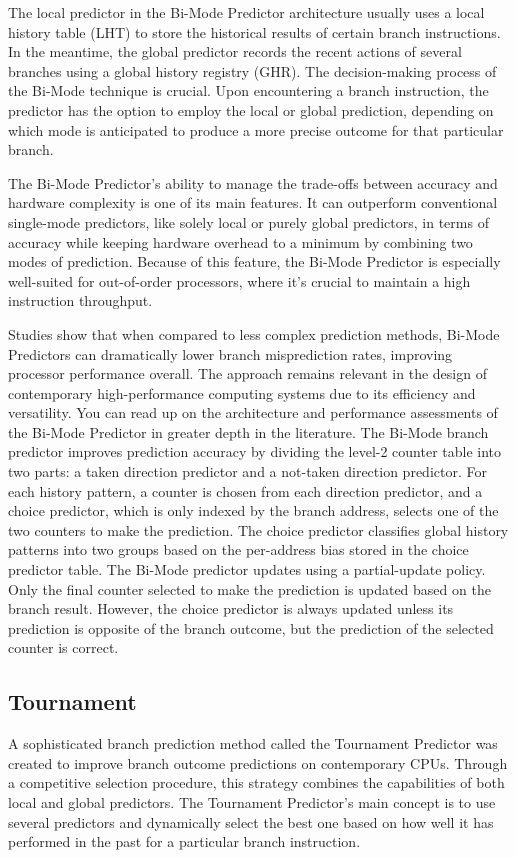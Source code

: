 \documentclass[10pt,journal,compsoc]{IEEEtran}
\begin{document}
The local predictor in the Bi-Mode Predictor architecture usually uses a local history table (LHT) to store the historical results of certain branch instructions. In the meantime, the global predictor records the recent actions of several branches using a global history registry (GHR). The decision-making process of the Bi-Mode technique is crucial. Upon encountering a branch instruction, the predictor has the option to employ the local or global prediction, depending on which mode is anticipated to produce a more precise outcome for that particular branch.

The Bi-Mode Predictor's ability to manage the trade-offs between accuracy and hardware complexity is one of its main features. It can outperform conventional single-mode predictors, like solely local or purely global predictors, in terms of accuracy while keeping hardware overhead to a minimum by combining two modes of prediction. Because of this feature, the Bi-Mode Predictor is especially well-suited for out-of-order processors, where it's crucial to maintain a high instruction throughput.

Studies show that when compared to less complex prediction methods, Bi-Mode Predictors can dramatically lower branch misprediction rates, improving processor performance overall. The approach remains relevant in the design of contemporary high-performance computing systems due to its efficiency and versatility. You can read up on the architecture and performance assessments of the Bi-Mode Predictor in greater depth in the literature.
The Bi-Mode branch predictor improves prediction accuracy by dividing the level-2 counter table into two parts: a taken direction predictor and a not-taken direction predictor.
For each history pattern, a counter is chosen from each direction predictor, and a choice predictor, which is only indexed by the branch address, selects one of the two counters to make the prediction. The choice predictor classifies global history patterns into two groups based on the per-address bias stored in the choice predictor table.
The Bi-Mode predictor updates using a partial-update policy. Only the final counter selected to make the prediction is updated based on the branch result. However, the choice predictor is always updated unless its prediction is opposite of the branch outcome, but the prediction of the selected counter is correct.\cite{mittalSurveyTechniquesDynamic2018}
\subsection{Tournament} 
\noindent A sophisticated branch prediction method called the Tournament Predictor was created to improve branch outcome predictions on contemporary CPUs. Through a competitive selection procedure, this strategy combines the capabilities of both local and global predictors. The Tournament Predictor's main concept is to use several predictors and dynamically select the best one based on how well it has performed in the past for a particular branch instruction.
\end{document}
